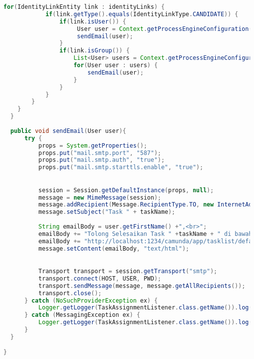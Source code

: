 \begin{lstlisting}[language=Java,basicstyle=\tiny,caption=TaskAssignmentListener.java]
    	for(IdentityLinkEntity link : identityLinks) {
    		if(link.getType().equals(IdentityLinkType.CANDIDATE)) {
    		    if(link.isUser()) {
	    		     User user = Context.getProcessEngineConfiguration().getIdentityService().createUserQuery().userId(link.getUserId()).singleResult();
	    		     sendEmail(user);
    		    }
    		    if(link.isGroup()) {
    		        List<User> users = Context.getProcessEngineConfiguration().getIdentityService().createUserQuery().memberOfGroup(link.getGroupId()).list();
    		        for(User user : users) {
    		        	sendEmail(user);
    		        }
    		    }
    		}
    	}
    }
  }
  
  public void sendEmail(User user){
      try {
          props = System.getProperties();
          props.put("mail.smtp.port", "587");
          props.put("mail.smtp.auth", "true");
          props.put("mail.smtp.starttls.enable", "true");

          
          session = Session.getDefaultInstance(props, null);
          message = new MimeMessage(session);
          message.addRecipient(Message.RecipientType.TO, new InternetAddress(user.getEmail()));
          message.setSubject("Task " + taskName);
          
          String emailBody = user.getFirstName() +",<br>";
          emailBody += "Tolong Selesaikan Task " +taskName + " di bawah ini.<br>";
          emailBody += "http://localhost:1234/camunda/app/tasklist/default/#/?task="+taskId;
          message.setContent(emailBody, "text/html");
          

          Transport transport = session.getTransport("smtp");            
          transport.connect(HOST, USER, PWD);
          transport.sendMessage(message, message.getAllRecipients());
          transport.close();
      } catch (NoSuchProviderException ex) {
          Logger.getLogger(TaskAssignmentListener.class.getName()).log(Level.SEVERE, null, ex);
      } catch (MessagingException ex) {
          Logger.getLogger(TaskAssignmentListener.class.getName()).log(Level.SEVERE, null, ex);
      }
  }

}


\end{lstlisting}
